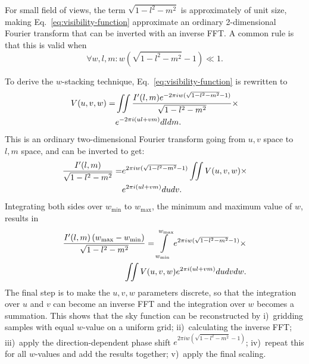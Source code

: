 \documentclass[useAMS,usenatbib]{mn2e}
\begin{document}
For small field of views, the term $\sqrt{1-l^2-m^2}$ is approximately of unit size, making Eq.~\eqref{eq:visibility-function} approximate an ordinary 2-dimensional Fourier transform that can be inverted with an inverse FFT. A common rule is that this is valid when
\begin{equation}\label{eq:when-2d-is-valid}
\forall w,l,m: w\left(\sqrt{1-l^2-m^2}-1\right) \ll 1.
\end{equation}

To derive the $w$-stacking technique, Eq.~\eqref{eq:visibility-function} is rewritten to
\begin{align}\notag
V(u,v,w) = & \iint \frac{I'(l,m) e^{-2\pi i w(\sqrt{1-l^2-m^2}-1)}}{\sqrt{1-l^2-m^2}} \times \\ \notag
& e^{-2\pi i \left(ul + vm\right)} dl dm.
\end{align}
This is an ordinary two-dimensional Fourier transform going from $u,v$ space to $l,m$ space, and can be inverted to get:
\begin{align}\notag
\frac{I'(l,m)}{\sqrt{1-l^2-m^2}} = & e^{2\pi i w(\sqrt{1-l^2-m^2}-1)} \iint V(u,v,w) \times \\ \notag
& e^{2\pi i \left(ul + vm\right)} du dv.
\end{align}
Integrating both sides over $w_{\min}$ to $w_{\max}$, the minimum and maximum value of $w$, results in
\begin{align}\notag
\frac{I'(l,m)\left(w_{\max} - w_{\min}\right)}{\sqrt{1-l^2-m^2}} = \int\limits_{w_{\min}}^{w_{\max}} e^{2\pi i w(\sqrt{1-l^2-m^2}-1)} \times \\ \label{eq:wstacking}
\iint V(u,v,w)  e^{2\pi i \left(ul + vm\right)} du dv dw.
\end{align}
The final step is to make the $u,v,w$ parameters discrete, so that the integration over $u$ and $v$ can become an inverse FFT and the integration over $w$ becomes a summation. This shows that the sky function can be reconstructed by i)~gridding samples with equal $w$-value on a uniform grid; ii)~calculating the inverse FFT; iii)~apply the direction-dependent phase shift $e^{2\pi i w(\sqrt{1-l^2-m^2}-1)}$; iv)~repeat this for all $w$-values and add the results together; v)~apply the final scaling.
\end{document}
